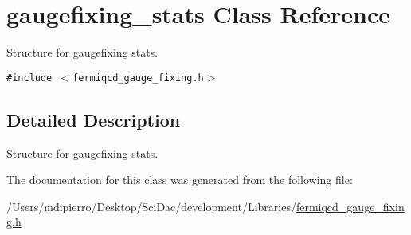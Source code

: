 \hypertarget{classgaugefixing__stats}{
\section{gaugefixing\_\-stats Class Reference}
\label{classgaugefixing__stats}
}
Structure for gaugefixing stats.  


{\tt \#include $<$fermiqcd\_\-gauge\_\-fixing.h$>$}



\subsection{Detailed Description}
Structure for gaugefixing stats. 

The documentation for this class was generated from the following file:\begin{CompactItemize}
\item 
/Users/mdipierro/Desktop/SciDac/development/Libraries/\hyperlink{fermiqcd__gauge__fixing_8h}{fermiqcd\_\-gauge\_\-fixing.h}\end{CompactItemize}
